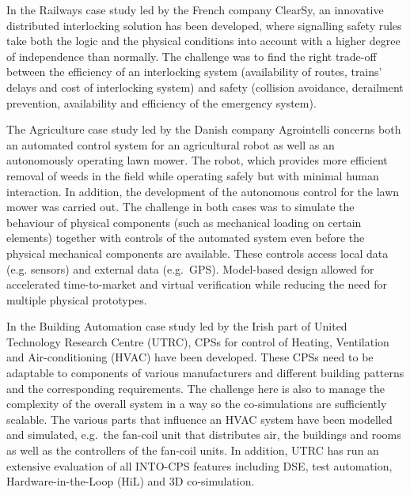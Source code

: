 In the Railways case study led by the French company ClearSy, an innovative distributed interlocking solution has been developed, where signalling safety rules take both the logic and the physical conditions into account with a higher degree of independence than normally. The challenge was to find the right trade-off between the efficiency of an interlocking system (availability of routes, trains' delays and cost of interlocking system) and safety (collision avoidance, derailment prevention, availability and efficiency of the emergency system).

The Agriculture case study led by the Danish company Agrointelli concerns both an automated control system for an agricultural robot as well as an autonomously operating lawn mower. The robot, which provides more efficient removal of weeds in the field while operating safely but with minimal human interaction. In addition, the development of the autonomous control for the lawn mower was carried out. The challenge in both cases was to simulate the behaviour of physical components (such as mechanical loading on certain elements) together with controls of the automated system even before the physical mechanical components are available. These controls access local data (e.g. sensors) and external data (e.g.\ GPS). Model-based design allowed for accelerated time-to-market and virtual verification while reducing the need for multiple physical prototypes. 

In the Building Automation case study led by the Irish part of United Technology Research Centre (UTRC), CPSs for control of Heating, Ventilation and Air-conditioning (HVAC) have been developed. These CPSs need to be adaptable to components of various manufacturers and different building patterns and the corresponding requirements. The challenge here is also to manage the complexity of the overall system in a way so the co-simulations are sufficiently scalable. The various parts that influence an HVAC system have been modelled and simulated, e.g.\ the fan-coil unit that distributes air, the buildings and rooms as well as the controllers of the fan-coil units. 
In addition, UTRC has run an extensive evaluation of all INTO-CPS features including DSE, test automation, Hardware-in-the-Loop (HiL) and 3D co-simulation.   


